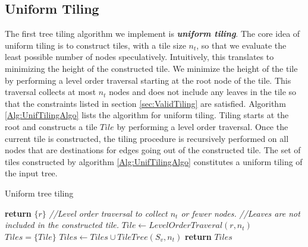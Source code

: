 \subsection{Uniform Tiling}
\label{sec:UnifTiling}
The first tree tiling algorithm we implement is \textbf{\emph{uniform tiling}}. The core idea of uniform tiling is to construct tiles,
with a tile size $n_t$, so that we evaluate 
the least possible number of nodes speculatively. Intuitively, this translates to minimizing the height of the constructed tile. We minimize
the height of the tile by performing a level order traversal starting at the root node of the tile. 
This traversal collects at most $n_t$ nodes
and does not include any leaves in the tile so that the constraints listed in section \ref{sec:ValidTiling} are satisfied. Algorithm 
\ref{Alg:UnifTilingAlgo} lists the algorithm for uniform tiling. Tiling starts at the root and constructs a tile $Tile$ by performing
a level order traversal. Once the current tile is constructed, the tiling procedure is recursively performed on all nodes that are 
destinations for edges going out of the constructed tile. The set of tiles constructed by algorithm \ref{Alg:UnifTilingAlgo} constitutes 
a uniform tiling of the input tree.
\begin{algorithm}
  \caption{Uniform tree tiling}
  \label{Alg:UnifTilingAlgo}
  \begin{algorithmic}
              \State \textbf{return} $\{ r \}$
          \EndIf
          \State \textcolor{codegreen}{\textit{//Level order traversal to collect $n_t$ or fewer nodes. }}
          \State \textcolor{codegreen}{\textit{//Leaves are not included in the constructed tile. }}
          \State $Tile \leftarrow LevelOrderTraveral(r, n_t)$
          \State $Tiles =  \{ Tile \}$
              \State $Tiles \leftarrow Tiles \cup TileTree(S_v, n_t)$
          \EndFor
          \State \textbf{return} $Tiles$
      \EndProcedure
  \end{algorithmic}
\end{algorithm}

